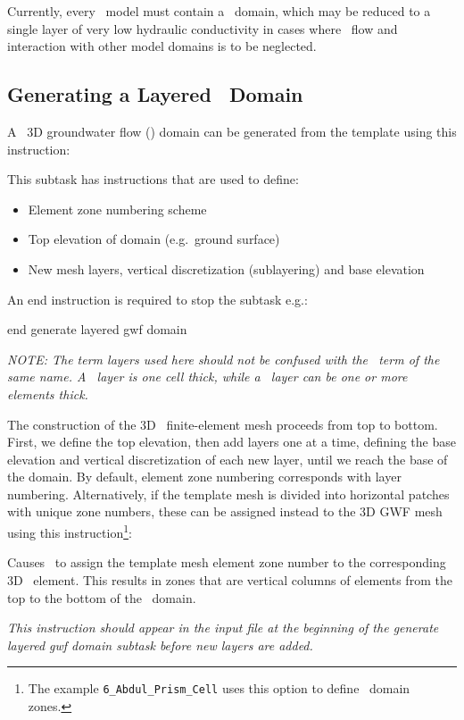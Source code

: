 \label{texfile:GWF}
Currently, every \mfus\ model must contain a \gwf\ domain, which may be reduced to a single layer of very low hydraulic conductivity in cases where \gwf\ flow and interaction with other model domains is to be neglected.

\subsection{Generating a Layered \gwf\ Domain}
A \mfus\ 3D groundwater flow (\gwf) domain can be generated from the template using this instruction:

    {This subtask has instructions that are used to define:
     \begin{itemize}
        \item Element zone numbering scheme
        \item Top elevation of domain (e.g.\ ground surface)
        \item New mesh layers, vertical discretization (sublayering) and base elevation
    \end{itemize}

    An end instruction is required to stop the subtask e.g.:

    {\Large \sf end generate layered gwf domain}
    }

    {\em NOTE: The term layers used here should not be confused with the \mf\ term of the same name. A \mf\ layer is one cell thick, while a \mut\ layer can be one or more elements thick.}

The construction of the 3D \gwf\ finite-element mesh proceeds from top to bottom.  First, we define the top elevation, then add layers one at a time, defining the base elevation and vertical discretization of each new layer,  until we reach the base of the domain. By default, element zone numbering  corresponds with layer numbering.  Alternatively, if the template mesh is divided into horizontal patches with unique zone numbers, these can be assigned instead to the 3D GWF mesh using this instruction\footnote{The example \texttt{6\_Abdul\_Prism\_Cell} uses this option to define \swf\ domain zones.}:

    {Causes \mut\ to assign the template mesh element zone number to the corresponding 3D \gwf\ element.  This results in zones that are vertical columns of elements from the top to the bottom of the \gwf\ domain.

    {\em This instruction should appear in the input file at the beginning of the \textsf{generate layered gwf domain} subtask before new layers are added.}
    }

